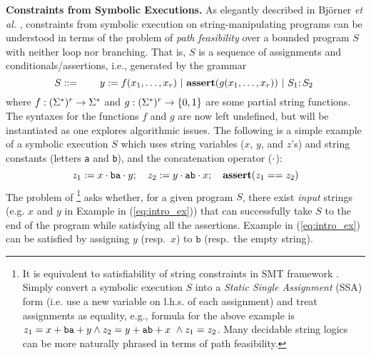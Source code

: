 \smallskip
\noindent
\textbf{Constraints from Symbolic Executions. }
As elegantly described in Bj\"{o}rner \emph{et al.} \cite{BTV09}, constraints 
from symbolic 
execution on string-manipulating programs can be understood in terms of the
problem of \emph{path 
feasibility} over a bounded program $S$ with neither loop nor
branching. %
That is, $S$ is a sequence of assignments and conditionals/assertions, i.e., 
generated by the grammar
%
\vspace{-2mm}
\begin{equation} 
    S ::= \qquad y := f(x_1,\ldots,x_\arity) \ |\
    \text{\ASSERT{$g(x_1,\ldots,x_\arity)$}}\ |\ 
            S_1; S_2\ 
            \label{eq:symbex}
\vspace{-1mm}
\end{equation}
%
where $f: (\Sigma^*)^r \to \Sigma^*$ and $g: (\Sigma^*)^r \to \{0,1\}$ are
some partial string functions. 
The syntaxes for the functions $f$ and $g$ are now
left undefined, but will be instantiated as one explores algorithmic issues.
The following is a simple example of a symbolic execution $S$
which uses string variables ($x$, $y$, and $z$'s) and string constants
(letters \texttt{a} and \texttt{b}), and the concatenation operator ($\cdot$):
\vspace{-2mm}
\begin{equation}
        z_1 := x \concat \text{\texttt{ba}} \concat y;\quad 
        z_2 := y \concat \text{\texttt{ab}} \concat x;\quad
        \ASSERT{z_1 == z_2}
        \label{eq:intro_ex}
        \vspace{-1mm}
\end{equation}
The problem of \footnote{
    It is equivalent to 
satisfiability of string constraints in SMT framework
\cite{SMT-CACM,SMT-chapter,KS08}.
Simply convert a symbolic execution $S$ 
into a \emph{Static Single Assignment} (SSA) form (i.e. use a new 
variable 
on l.h.s. of each assignment) and treat assignments as equality,
e.g., formula for the above example is
        $z_1 = x + \text{\texttt{ba}} + y \wedge
        z_2 = y + \text{\texttt{ab}} + x\ \wedge
        z_1 = z_2$.
Many decidable string logics can be more naturally phrased in terms of
path feasibility.}
asks whether, for a given program $S$, there exist \emph{input} strings (e.g.
$x$ and $y$ in Example in (\ref{eq:intro_ex}))
that can successfully take
$S$ to the end of the program while satisfying all the assertions. 
Example in (\ref{eq:intro_ex}) can be satisfied by
assigning $y$ (resp.~$x$) to $\texttt{b}$ (resp.~the empty string). 


